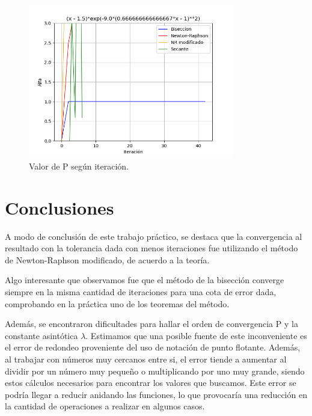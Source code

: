 \documentclass[titlepage,a4paper]{article}
\begin{document}
\begin{figure}[H]
    \centering
    \includegraphics[width=0.8\textwidth]{alfa f3.png}
    \caption{\label{fig:class01}Valor de P según iteración.}
\end{figure}


\newpage

\section{Conclusiones}\label{sec:conclusiones}

A modo de conclusión de este trabajo práctico, se destaca que la convergencia al resultado con la tolerancia dada con menos iteraciones fue utilizando el método de Newton-Raphson modificado, de acuerdo a la teoría. 

Algo interesante que observamos fue que el método de la bisección converge siempre en la misma cantidad de iteraciones para una cota de error dada, comprobando en la práctica uno de los teoremas del método.

Además, se encontraron dificultades para hallar el orden de convergencia P y la constante asintótica $\lambda$. Estimamos que una posible fuente de este inconveniente es el error de redondeo proveniente del uso de notación de punto flotante. Además, al trabajar con números muy cercanos entre si, el error tiende a aumentar al dividir por un número muy pequeño o multiplicando por uno muy grande, siendo estos cálculos necesarios para encontrar los valores que buscamos. Este error se podría llegar a reducir anidando las funciones, lo que provocaría una reducción en la cantidad de operaciones a realizar en algunos casos.
 
\end{document}
